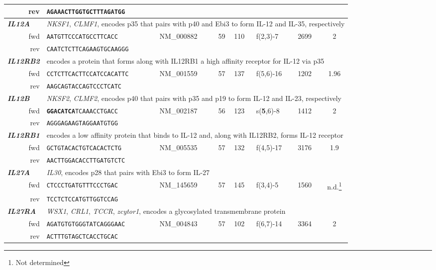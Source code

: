 \documentclass[12pt,a4paper]{scrreprt} %
\begin{document}
\begin{table}
{\begin{tabular}{rllclllc}
\ rev & \texttt{AGAAACTTGGTGCTTTAGATGG} &  &  &  &  &  &  \\ 
\hline \multicolumn{1}{l}{\textit{\textbf{IL12A}}} & \multicolumn{7}{l}{\textit{NKSF1}, \textit{CLMF1}, encodes p35 that pairs with p40 and Ebi3 to form IL-12 and IL-35, respectively} \\ 
\ fwd & \texttt{AATGTTCCCATGCCTTCACC} & NM\_000882 & 59 & 110 & f(2,3)-7 & 2699 & 2 \\ 
\ rev & \texttt{CAATCTCTTCAGAAGTGCAAGGG} &  &  &  &  &  &  \\ 
\hline \multicolumn{1}{l}{\textit{\textbf{IL12RB2}}} & \multicolumn{7}{l}{encodes a protein that forms along with IL12RB1 a high affinity receptor for IL-12 via p35} \\ 
\ fwd & \texttt{CCTCTTCACTTCCATCCACATTC} & NM\_001559 & 57 & 137 & f(5,6)-16 & 1202 & 1.96 \\ 
\ rev & \texttt{AAGCAGTACCAGTCCCTCATC} &  &  &  &  &  &  \\ 
\hline \multicolumn{1}{l}{\textit{\textbf{IL12B}}} & \multicolumn{7}{l}{\textit{NKSF2}, \textit{CLMF2}, encodes p40 that pairs with p35 and p19 to form IL-12 and IL-23, respectively} \\ 
\ fwd & \texttt{\textbf{GGACATCA}TCAAACCTGACC} & NM\_002187 & 56 & 123 & s(\textbf{5},6)-8 & 1412 & 2 \\ 
\ rev & \texttt{AGGGAGAAGTAGGAATGTGG} &  &  &  &  &  &  \\ 
\hline \multicolumn{1}{l}{\textit{\textbf{IL12RB1}}} & \multicolumn{7}{l}{encodes a low affinity protein that binds to IL-12 and, along with IL12RB2, forms IL-12 receptor} \\ 
\ fwd & \texttt{GCTGTACACTGTCACACTCTG} & NM\_005535 & 57 & 132 & f(4,5)-17 & 3176 & 1.9 \\ 
\ rev & \texttt{AACTTGGACACCTTGATGTCTC} &  &  &  &  &  &  \\ 
\hline \multicolumn{1}{l}{\textit{\textbf{IL27A}}} & \multicolumn{7}{l}{\textit{IL30}, encodes p28 that pairs with Ebi3 to form IL-27} \\ 
\ fwd & \texttt{CTCCCTGATGTTTCCCTGAC} & NM\_145659 & 57 & 145 & f(3,4)-5 & 1560 & n.d.\footnote{Not determined} \\ 
\ rev & \texttt{TCCTCTCCATGTTGGTCCAG} &  &  &  &  &  &  \\ 
\hline \multicolumn{1}{l}{\textit{\textbf{IL27RA}}} & \multicolumn{7}{l}{\textit{WSX1}, \textit{CRL1}, \textit{TCCR}, \textit{zcytor1}, encodes a glycosylated transmembrane protein} \\ 
\ fwd & \texttt{AGATGTGTGGGTATCAGGGAAC} & NM\_004843 & 57 & 102 & f(6,7)-14 & 3364 & 2 \\ 
\ rev & \texttt{ACTTTGTAGCTCACCTGCAC} &  &  &  &  &  &  \\ 
\hline 
\end{tabular} }
\end{table}
\end{document}
